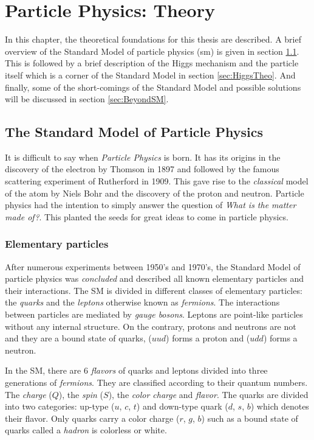 \chapter{Particle Physics: Theory}

In this chapter, the theoretical foundations for this thesis are described. A brief overview of the Standard Model of particle physics (\acrshort{sm}) is given in section \ref{sec:SM}. This is followed by a brief description of the Higgs mechanism and the particle itself which is a corner of the Standard Model in section \ref{sec:HiggsTheo}. And finally, some of the short-comings of the Standard Model and possible solutions will be discussed in section \ref{sec:BeyondSM}.

\section{The Standard Model of Particle Physics}
\label{sec:SM}

It is difficult to say when \textit{Particle Physics} is born. It has its origins in the discovery of the electron by Thomson \cite{JJThomson:1897} in 1897 and followed by the famous scattering experiment of Rutherford \cite{Rutherford:1911} in 1909. This gave rise to the \textit{classical} model of the atom by Niels Bohr and the discovery of the proton and neutron. Particle physics had the intention to simply answer the question of \textit{What is the matter made of?}. This planted the seeds for great ideas to come in particle physics.

\subsection{Elementary particles}

After numerous experiments between 1950's and 1970's, the Standard Model of particle physics was \textit{concluded} and described all known elementary particles and their interactions. The SM is divided in different classes of elementary particles: the \textit{quarks} and the \textit{leptons} otherwise known as \textit{fermions}. The interactions between particles are mediated by \textit{gauge bosons}. Leptons are point-like particles without any internal structure. On the contrary, protons and neutrons are not and they are a bound state of quarks, ($uud$) forms a proton and ($udd$) forms a neutron.

In the SM, there are 6 \textit{flavors} of quarks and leptons divided into three generations of \textit{fermions}. They are classified according to their quantum numbers. The \textit{charge} ($Q$), the \textit{spin} ($S$), the \textit{color charge} and \textit{flavor}. The quarks are divided into two categories: up-type ($u$, $c$, $t$) and down-type quark ($d$, $s$, $b$) which denotes their flavor. Only quarks carry a color charge ($r$, $g$, $b$) such as a bound state of quarks called a \textit{hadron} is colorless or white.


